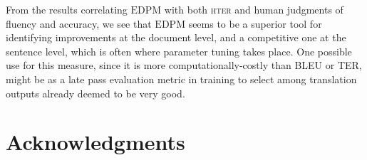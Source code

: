 \documentclass[11pt]{article}
\newcommand{\blindthis}[1]{}
\newcommand{\myEDPM}[0]{\ensuremath{\mathrm{EDPM}}}
\begin{document}
From the results correlating \myEDPM{} with both \textsc{hter} and
human judgments of fluency and accuracy, we see that \myEDPM{} seems
to be a superior tool for identifying improvements at the document
level, and a competitive one at the sentence level, which is often
where parameter tuning takes place. One possible use for this measure,
since it is more computationally-costly than BLEU or TER, might be as a late
pass evaluation metric in training to select among translation outputs
already deemed to be very good.

\section*{Acknowledgments}
\blindthis{
Grant numbers etc.\ go here.
}



\end{document}

